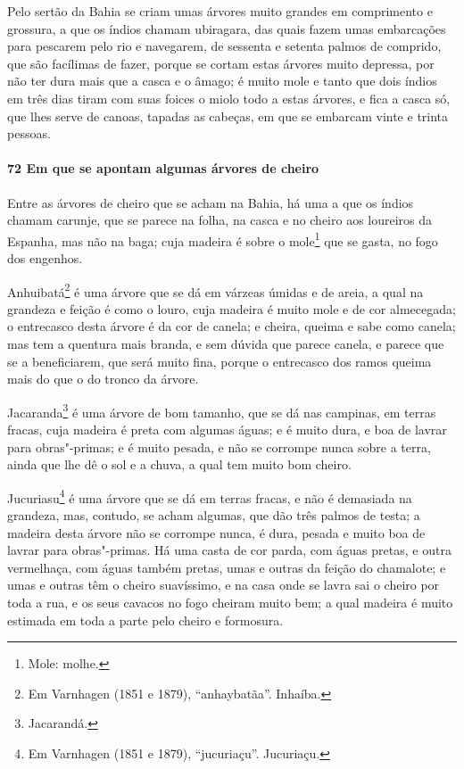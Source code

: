 Pelo sertão da Bahia se criam umas árvores muito grandes em comprimento e grossura, a que
os índios chamam ubiragara, das quais fazem umas embarcações para pescarem pelo rio e
navegarem, de sessenta e setenta palmos de comprido, que são facílimas de fazer, porque se
cortam estas árvores muito depressa, por não ter dura mais que a casca e o âmago; é muito
mole e tanto que dois índios em três dias tiram com suas foices o miolo todo a estas
árvores, e fica a casca só, que lhes serve de canoas, tapadas as cabeças, em que se
embarcam vinte e trinta pessoas.

\paragraph{72 Em que se apontam algumas árvores de cheiro}

Entre as árvores de cheiro que se acham na Bahia, há uma a que os índios chamam carunje,
que se parece na folha, na casca e no cheiro aos loureiros da Espanha, mas não na baga;
cuja madeira é sobre o mole\footnote{ Mole: molhe.} que se gasta, no fogo dos engenhos.


Anhuibatá\footnote{ Em Varnhagen (1851 e 1879), ``anhaybatãa''. Inhaíba.} é uma árvore que
se dá em várzeas úmidas e de areia, a qual na grandeza e feição é como o louro, cuja
madeira é muito mole e de cor almecegada; o entrecasco desta árvore é da cor de canela; e
cheira, queima e sabe como canela; mas tem a quentura mais branda, e sem dúvida que parece
canela, e parece que se a beneficiarem, que será muito fina, porque o entrecasco dos ramos
queima mais do que o do tronco da árvore.

Jacaranda\footnote{ Jacarandá.} é uma árvore de bom tamanho, que se dá nas campinas, em
terras fracas, cuja madeira é preta com algumas águas; e é muito dura, e boa de lavrar
para obras"-primas; e é muito pesada, e não se corrompe nunca sobre a terra, ainda que lhe
dê o sol e a chuva, a qual tem muito bom cheiro.

Jucuriasu\footnote{ Em Varnhagen (1851 e 1879), ``jucuriaçu''. Jucuriaçu.} é uma árvore
que se dá em terras fracas, e não é demasiada na grandeza, mas, contudo, se acham algumas,
que dão três palmos de testa; a madeira desta árvore não se corrompe nunca, é dura, pesada
e muito boa de lavrar para obras"-primas. Há uma casta de cor parda, com águas pretas, e
outra vermelhaça, com águas também pretas, umas e outras da feição do chamalote; e umas e
outras têm o cheiro suavíssimo, e na casa onde se lavra sai o cheiro por toda a rua, e os
seus cavacos no fogo cheiram muito bem; a qual madeira é muito estimada em toda a parte
pelo cheiro e formosura.

